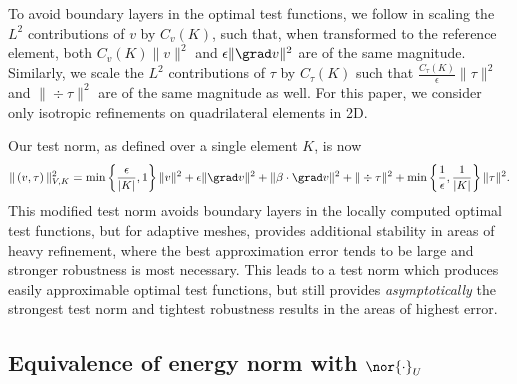 To avoid boundary layers in the optimal test functions, we follow \cite{DPGrobustness} in scaling the $L^2$ contributions of $v$ by $C_v(K)$, such that, when transformed to the reference element, both $C_v(K)\|v\|^2$ and $\epsilon\|\grad v\|^2$ are of the same magnitude. Similarly, we scale the $L^2$ contributions of $\tau$ by $C_\tau(K)$ such that $\frac{C_\tau(K)}{\epsilon} \|\tau\|^2$ and $\|\div \tau\|^2$ are of the same magnitude as well. For this paper, we consider only isotropic refinements on quadrilateral elements in 2D.

Our test norm, as defined over a single element $K$, is now
\[
\|\left(v,\tau\right)\|_{V,K}^2 = \min\left\{\frac{\epsilon}{|K|},1\right\}\|v\|^2 + \epsilon \|\grad v\|^2 + \|\beta \cdot \grad v\|^2 + \| \div \tau\|^2 + \min\left\{\frac{1}{\epsilon},\frac{1}{|K|}\right\}\|\tau\|^2.
\]
This modified test norm avoids boundary layers in the locally computed optimal test functions, but for adaptive meshes, provides additional stability in areas of heavy refinement, where the best approximation error tends to be large and stronger robustness is most necessary.  This leads to a test norm which produces easily approximable optimal test functions, but still provides \textit{asymptotically} the strongest test norm and tightest robustness results in the areas of highest error. 

\subsection{Equivalence of energy norm with $\nor{\cdot}_U$}
\label{sec:main_bounds}

